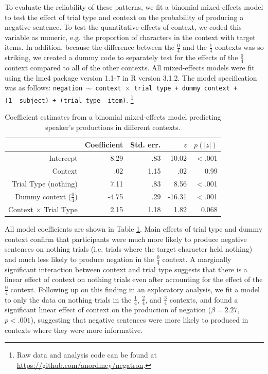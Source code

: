 \documentclass[man, noapacite]{apa2}
\begin{document}
To evaluate the reliability of these patterns, we fit a binomial mixed-effects model to test the effect of trial type and context on the probability of producing a negative sentence.  To test the quantitative effects of context, we coded this variable as numeric, e.g. the proportion of characters in the context with target items.  In addition, because the difference between the  $\frac{0}{4}$ and the  $\frac{1}{4}$ contexts was so striking, we created a dummy code to separately test for the effects of the  $\frac{0}{4}$ context compared to all of the other contexts.  All mixed-effects models were fit using the lme4 package version 1.1-7 in R version 3.1.2.  The model specification was as follows: \texttt{negation $\sim$ context~$\times$~trial type + dummy context + (1~\textbar~subject) +  (trial type~\textbar~item)}.  \footnote{Raw data and analysis code can be found at \url{https://github.com/anordmey/negatron}.}

\begin{table}[t]
\caption{\label{tab:speakermodel} Coefficient estimates from a binomial mixed-effects model predicting speaker's productions in different contexts.}
\begin{center}
\begin{tabular}{rrrrr}
  \hline
 & Coefficient & Std. err. & $z$ & $p(|z|)$ \\ 
  \hline
Intercept & -8.29 & .83 & -10.02 & $<$.001 \\ 
  Context & .02 & 1.15 & .02 &  0.99 \\ 
  Trial Type (nothing) & 7.11 & .83 & 8.56 & $<$.001 \\
  Dummy context ($\frac{0}{4}$) & -4.75& .29 & -16.31 & $<$.001 \\ 
  Context $\times$ Trial Type & 2.15 & 1.18 & 1.82 & 0.068 \\
   \hline
\end{tabular}
\vspace{-1.5cm}
\end{center}
\end{table}

All model coefficients are shown in Table \ref{tab:speakermodel}.  Main effects of trial type and dummy context confirm that participants were much more likely to produce negative sentences on nothing trials (i.e. trials where the target character held nothing) and much less likely to produce negation in the $\frac{0}{4}$ context.  A marginally significant interaction between context and trial type suggests that there is a linear effect of context on nothing trials even after accounting for the effect of the $\frac{0}{4}$ context.  Following up on this finding in an exploratory analysis, we fit a model to only the data on nothing trials in the $\frac{1}{4}$, $\frac{2}{4}$, and $\frac{3}{4}$ contexts, and found a significant linear effect of context on the production of negation ($\beta= 2.27$, $p< .001$), suggesting that negative sentences were more likely to produced in contexts where they were more informative.  
\end{document}
